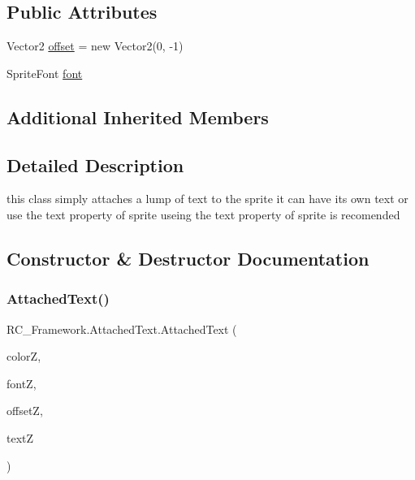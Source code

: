 \subsection*{Public Attributes}
\begin{DoxyCompactItemize}
\item 
Vector2 \mbox{\hyperlink{class_r_c___framework_1_1_attached_text_a7305fc71a2f3bcba1e64dfd179dbb847}{offset}} = new Vector2(0, -\/1)
\item 
Sprite\+Font \mbox{\hyperlink{class_r_c___framework_1_1_attached_text_a890a2a05d38c24d664cdfa28e96b6092}{font}}
\end{DoxyCompactItemize}
\subsection*{Additional Inherited Members}


\subsection{Detailed Description}
this class simply attaches a lump of text to the sprite it can have its own text or use the text property of sprite useing the text property of sprite is recomended 



\subsection{Constructor \& Destructor Documentation}
\mbox{\label{class_r_c___framework_1_1_attached_text_a39ea4d4bc1ab6294a506e02826dc8a19}} 
\subsubsection{\texorpdfstring{Attached\+Text()}{AttachedText()}\hspace{0.1cm}{\footnotesize\ttfamily [1/3]}}
{\footnotesize\ttfamily R\+C\+\_\+\+Framework.\+Attached\+Text.\+Attached\+Text (\begin{DoxyParamCaption}\item[{Color}]{colorZ,  }\item[{Sprite\+Font}]{fontZ,  }\item[{Vector2}]{offsetZ,  }\item[{string}]{textZ }\end{DoxyParamCaption})}

